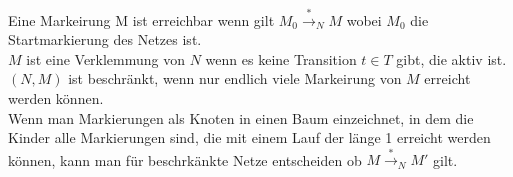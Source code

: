 \documentclass[11pt]{scrartcl}
\begin{document}
Eine Markeirung M ist erreichbar wenn gilt $M_0 \stackrel{\ast}{\rightarrow}_N M$ wobei $M_0$ die Startmarkierung des Netzes ist. \\

$M$ ist eine Verklemmung von $N$ wenn es keine Transition $t \in T$ gibt, die aktiv ist. \\

$(N,M)$ ist beschränkt, wenn nur endlich viele Markeirung von $M$ erreicht werden können. \\

Wenn man Markierungen als Knoten in einen Baum einzeichnet, in dem die Kinder alle Markierungen sind, die mit einem Lauf der länge 1 erreicht werden können, kann man für beschrkänkte Netze entscheiden ob $M \stackrel{\ast}{\rightarrow}_N M'$ gilt.
\end{document}

